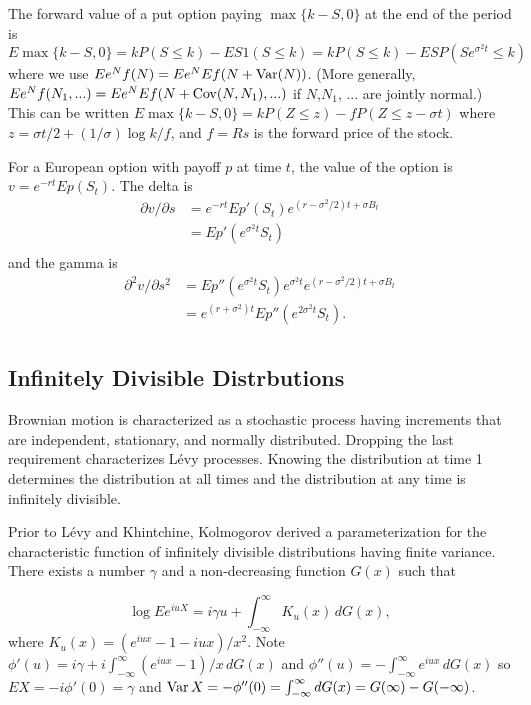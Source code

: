 \documentclass[fleqn]{amsart}
\newcommand{\Var}{\mathop{\rm{Var}}}
\newcommand{\Cov}{\mathop{\rm{Cov}}}
\begin{document}
The forward value of a put option paying \(\max\{k - S, 0\}\) 
at the end of the period is 
\(E\max\{k - S, 0\} = kP(S\le k) - ES1(S\le k)
= kP(S\le k) - ESP(Se^{\sigma^2t}\le k)\)
where we use \(Ee^N f(N) = Ee^N Ef(N + \Var(N))\). 
(More generally, \(Ee^Nf(N_1,...) = Ee^N Ef(N + \Cov(N, N_1),...)\) 
if \(N\),\(N_1\), ... are jointly normal.) 
This can be written 
\(E\max\{k - S, 0\} = k P(Z \le z) - f P(Z \le z - \sigma t)\)
where \(z = \sigma t/2 + (1/\sigma)\log k/f\), and \(f = Rs\)
is the forward price of the stock.

For a European option with payoff \(p\) at time \(t\), the
value of the option is \(v = e^{-rt}Ep(S_t)\). The delta is
\begin{align*}
\partial v/\partial s &= e^{-rt}Ep'(S_t)e^{(r - \sigma^2/2)t + \sigma B_t}\\
&= Ep'(e^{\sigma^2t}S_t)\\
\end{align*}
and the gamma is
\begin{align*}
\partial^2 v/\partial s^2 &= Ep''(e^{\sigma^2t}S_t)e^{\sigma^2t}e^{(r - \sigma^2/2)t + \sigma B_t}\\
&= e^{(r + \sigma^2)t}Ep''(e^{2\sigma^2t}S_t).\\
\end{align*}
%
%

\subsection{Infinitely Divisible Distrbutions}
Brownian motion is characterized as a stochastic process having
increments that are independent, stationary, and normally distributed.
Dropping the last requirement characterizes L\'evy processes\cite{Ber1998}.
Knowing the distribution at time 1 determines the distribution at
all times and the distribution at any time is infinitely
divisible. 

Prior to L\'evy and Khintchine, Kolmogorov \cite{kol1932} derived a
parameterization for the characteristic function of infinitely divisible
distributions having finite variance. There exists a number \(\gamma\)
and a non-decreasing function \(G(x)\) such that

\[
\log Ee^{iuX} = i\gamma u + \int_{-\infty}^\infty K_u(x)\,dG(x),
\]
where \(K_u(x) = (e^{iux} - 1 - iux)/x^2\).
Note \(\phi'(u) = i\gamma + i\int_{-\infty}^\infty (e^{iux} - 1)/x\,dG(x)\)
and \(\phi''(u) = -\int_{-\infty}^\infty e^{iux}\,dG(x)\)
so \(E X = -i\phi'(0) = \gamma\) and \(\Var X = -\phi''(0)
= \int_{-\infty}^\infty dG(x) = G(\infty) - G(-\infty)\).
\end{document}
